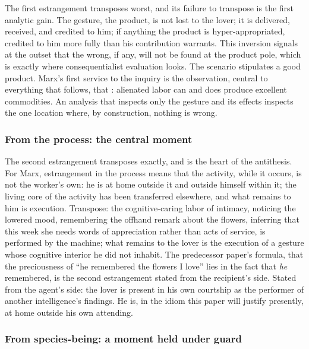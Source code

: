 The first estrangement transposes worst, and its failure to transpose is the first analytic gain. The gesture, the product, is not lost to the lover; it is delivered, received, and credited to him; if anything the product is hyper-appropriated, credited to him more fully than his contribution warrants. This inversion signals at the outset that the wrong, if any, will not be found at the product pole, which is exactly where consequentialist evaluation looks. The scenario stipulates a good product. Marx's first service to the inquiry is the observation, central to everything that follows, that : alienated labor can and does produce excellent commodities. An analysis that inspects only the gesture and its effects inspects the one location where, by construction, nothing is wrong.

\subsubsection{From the process: the central moment}
\label{p02:sec:marx-process}

The second estrangement transposes exactly, and is the heart of the antithesis. For Marx, estrangement in the process means that the activity, while it occurs, is not the worker's own: he is at home outside it and outside himself within it; the living core of the activity has been transferred elsewhere, and what remains to him is execution. Transpose: the cognitive-caring labor of intimacy, noticing the lowered mood, remembering the offhand remark about the flowers, inferring that this week she needs words of appreciation rather than acts of service, is performed by the machine; what remains to the lover is the execution of a gesture whose cognitive interior he did not inhabit. The predecessor paper's formula, that the preciousness of ``he remembered the flowers I love'' lies in the fact that \emph{he} remembered, is the second estrangement stated from the recipient's side. Stated from the agent's side: the lover is present in his own courtship as the performer of another intelligence's findings. He is, in the idiom this paper will justify presently, at home outside his own attending.

\subsubsection{From species-being: a moment held under guard}
\label{p02:sec:marx-species}

